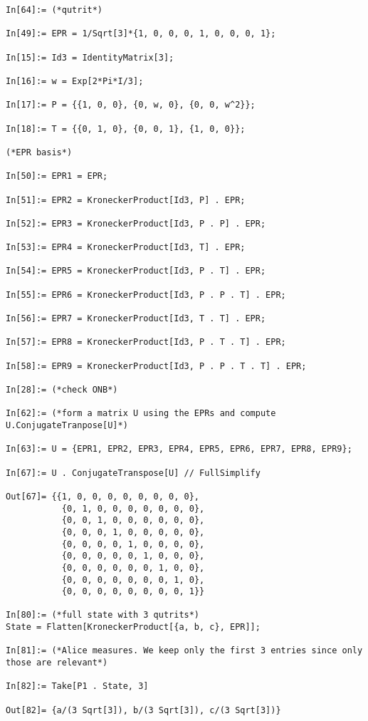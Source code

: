 \documentclass{article}
\theoremstyle{definition}
\begin{document}
\begin{lstlisting}
In[64]:= (*qutrit*)

In[49]:= EPR = 1/Sqrt[3]*{1, 0, 0, 0, 1, 0, 0, 0, 1};

In[15]:= Id3 = IdentityMatrix[3];

In[16]:= w = Exp[2*Pi*I/3];

In[17]:= P = {{1, 0, 0}, {0, w, 0}, {0, 0, w^2}};

In[18]:= T = {{0, 1, 0}, {0, 0, 1}, {1, 0, 0}};

(*EPR basis*)

In[50]:= EPR1 = EPR;

In[51]:= EPR2 = KroneckerProduct[Id3, P] . EPR;

In[52]:= EPR3 = KroneckerProduct[Id3, P . P] . EPR;

In[53]:= EPR4 = KroneckerProduct[Id3, T] . EPR;

In[54]:= EPR5 = KroneckerProduct[Id3, P . T] . EPR;

In[55]:= EPR6 = KroneckerProduct[Id3, P . P . T] . EPR;

In[56]:= EPR7 = KroneckerProduct[Id3, T . T] . EPR;

In[57]:= EPR8 = KroneckerProduct[Id3, P . T . T] . EPR;

In[58]:= EPR9 = KroneckerProduct[Id3, P . P . T . T] . EPR;

In[28]:= (*check ONB*)

In[62]:= (*form a matrix U using the EPRs and compute U.ConjugateTranpose[U]*)

In[63]:= U = {EPR1, EPR2, EPR3, EPR4, EPR5, EPR6, EPR7, EPR8, EPR9};

In[67]:= U . ConjugateTranspose[U] // FullSimplify

Out[67]= {{1, 0, 0, 0, 0, 0, 0, 0, 0}, 
	       {0, 1, 0, 0, 0, 0, 0, 0, 0}, 
	       {0, 0, 1, 0, 0, 0, 0, 0, 0}, 
	       {0, 0, 0, 1, 0, 0, 0, 0, 0}, 
	       {0, 0, 0, 0, 1, 0, 0, 0, 0}, 
	       {0, 0, 0, 0, 0, 1, 0, 0, 0}, 
	       {0, 0, 0, 0, 0, 0, 1, 0, 0}, 
	       {0, 0, 0, 0, 0, 0, 0, 1, 0}, 
	       {0, 0, 0, 0, 0, 0, 0, 0, 1}}
  
In[80]:= (*full state with 3 qutrits*)
State = Flatten[KroneckerProduct[{a, b, c}, EPR]];

In[81]:= (*Alice measures. We keep only the first 3 entries since only those are relevant*)

In[82]:= Take[P1 . State, 3]

Out[82]= {a/(3 Sqrt[3]), b/(3 Sqrt[3]), c/(3 Sqrt[3])}


\end{lstlisting}
\end{document}
